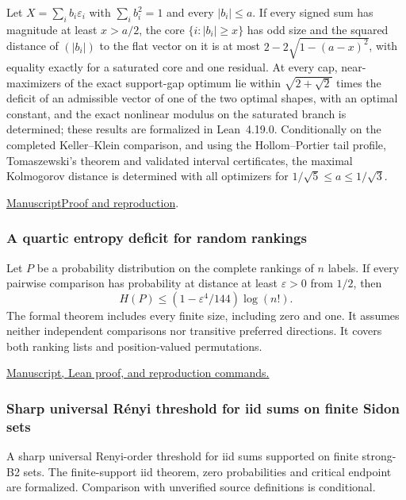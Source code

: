 \documentclass[11pt,a4paper]{article}
\begin{document}
Let $X=\sum_i b_i\varepsilon_i$ with $\sum_i b_i^2=1$ and every $|b_i|\le a$. If every signed sum has magnitude at least $x>a/2$, the core $\{i:|b_i|\ge x\}$ has odd size and the squared distance of $(|b_i|)$ to the flat vector on it is at most $2-2\sqrt{1-(a-x)^2}$, with equality exactly for a saturated core and one residual. At every cap, near-maximizers of the exact support-gap optimum lie within $\sqrt{2+\sqrt2}$ times the deficit of an admissible vector of one of the two optimal shapes, with an optimal constant, and the exact nonlinear modulus on the saturated branch is determined; these results are formalized in Lean~4.19.0. Conditionally on the completed Keller--Klein comparison, and using the Hollom--Portier tail profile, Tomaszewski's theorem and validated interval certificates, the maximal Kolmogorov distance is determined with all optimizers for $1/\sqrt5\le a\le1/\sqrt3$.

\noindent\href{https://github.com/dvgyl/math-and-theory/blob/main/papers/mathematics/keller-klein-sharp-stability/manuscript.pdf}{Manuscript}\quad\href{https://github.com/dvgyl/math-and-theory/blob/main/papers/mathematics/keller-klein-sharp-stability/README.md}{Proof and reproduction}.

\subsubsection{A quartic entropy deficit for random rankings}

Let $P$ be a probability distribution on the complete rankings of $n$ labels. If every pairwise comparison has probability at distance at least $\varepsilon>0$ from $1/2$, then
\[
H(P)\le (1-\varepsilon^4/144)\log(n!).
\]
The formal theorem includes every finite size, including zero and one. It assumes neither independent comparisons nor transitive preferred directions. It covers both ranking lists and position-valued permutations.

\href{https://github.com/dvgyl/math-and-theory/tree/main/papers/mathematics/quartic-rankings}{Manuscript, Lean proof, and reproduction commands.}

\subsubsection{Sharp universal Rényi threshold for iid sums on finite Sidon sets}

A sharp universal Renyi-order threshold for iid sums supported on finite strong-B2 sets. The finite-support iid theorem, zero probabilities and critical endpoint are formalized. Comparison with unverified source definitions is conditional.
\end{document}
